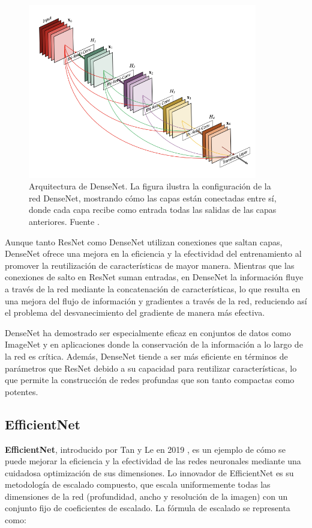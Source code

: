 \begin{figure}
	\label{key}
	\centering
	\includegraphics[width=100mm]{img/densenet.png}
	\caption{Arquitectura de DenseNet. La figura ilustra la configuración de la red
		DenseNet, mostrando cómo las capas están conectadas entre sí, donde cada capa recibe
		como entrada todas las salidas de las capas anteriores. Fuente
		\cite{huang2017densely}.}
\end{figure}

Aunque tanto ResNet como DenseNet utilizan conexiones que saltan capas, DenseNet
ofrece una mejora en la eficiencia y la efectividad del entrenamiento al promover
la reutilización de características de mayor manera. Mientras que las conexiones
de salto en ResNet suman entradas, en DenseNet la información fluye a través de la
red mediante la concatenación de características, lo que resulta en una mejora
del flujo de información y gradientes a través de la red, reduciendo así el problema
del desvanecimiento del gradiente de manera más efectiva.

DenseNet ha demostrado ser especialmente eficaz en conjuntos de datos como ImageNet
y en aplicaciones donde la conservación de la información a lo largo de la red es
crítica. Además, DenseNet tiende a ser más eficiente en términos de parámetros que
ResNet debido a su capacidad para reutilizar características, lo que permite la
construcción de redes profundas que son tanto compactas como potentes.

\subsection{EfficientNet}

\textbf{EfficientNet}, introducido por Tan y Le en 2019 \cite{tan2019efficientnet},
es un ejemplo de cómo se puede mejorar la eficiencia y la efectividad de las
redes neuronales mediante una cuidadosa optimización de sus dimensiones. Lo innovador
de EfficientNet es su metodología de escalado compuesto, que escala
uniformemente todas las dimensiones de la red (profundidad, ancho y resolución
de la imagen) con un conjunto fijo de coeficientes de escalado. La fórmula de
escalado se representa como:

